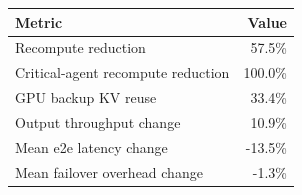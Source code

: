 \begin{tabular}{lr}
\toprule
Metric & Value \\
\midrule
Recompute reduction & 57.5\% \\
Critical-agent recompute reduction & 100.0\% \\
GPU backup KV reuse & 33.4\% \\
Output throughput change & 10.9\% \\
Mean e2e latency change & -13.5\% \\
Mean failover overhead change & -1.3\% \\
\bottomrule
\end{tabular}
